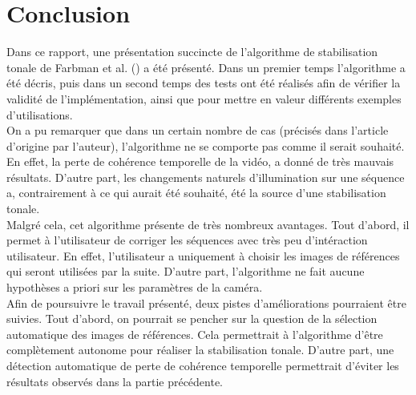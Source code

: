 \section{Conclusion}

Dans ce rapport, une présentation succincte de l'algorithme de stabilisation tonale de Farbman et al. (\cite{farbman2011tonal}) a été présenté. Dans un premier temps l'algorithme a été décris, puis dans un second temps des tests ont été réalisés afin de vérifier la validité de l'implémentation, ainsi que pour mettre en valeur différents exemples d'utilisations.\\

On a pu remarquer que dans un certain nombre de cas (précisés dans l'article d'origine par l'auteur), l'algorithme ne se comporte pas comme il serait souhaité. En effet, la perte de cohérence temporelle de la vidéo, a donné de très mauvais résultats. D'autre part, les changements naturels d'illumination sur une séquence a, contrairement à ce qui aurait été souhaité, été la source d'une stabilisation tonale.\\

Malgré cela, cet algorithme présente de très nombreux avantages. Tout d'abord, il permet à l'utilisateur de corriger les séquences avec très peu d'intéraction utilisateur. En effet, l'utilisateur a uniquement à choisir les images de références qui seront utilisées par la suite. D'autre part, l'algorithme ne fait aucune hypothèses a priori sur les paramètres de la caméra.\\

Afin de poursuivre le travail présenté, deux pistes d'améliorations pourraient être suivies. Tout d'abord, on pourrait se pencher sur la question de la sélection automatique des images de références. Cela permettrait à l'algorithme d'être complètement autonome pour réaliser la stabilisation tonale. D'autre part, une détection automatique de perte de cohérence temporelle permettrait d'éviter les résultats observés dans la partie précédente.